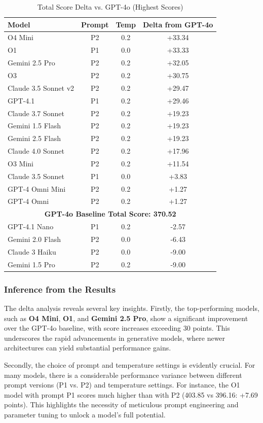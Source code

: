\begin{table}[!htbp]
\centering
\small
\caption{Total Score Delta vs. GPT-4o (Highest Scores)}
\label{tab:deepeval_delta_results}
\begin{tabular}{|l|c|c|c|}
\hline
\textbf{Model} & \textbf{Prompt} & \textbf{Temp} & \textbf{Delta from GPT-4o} \\
\hline
O4 Mini & P2 & 0.2 & +33.34 \\
O1 & P1 & 0.0 & +33.33 \\
Gemini 2.5 Pro & P2 & 0.2 & +32.05 \\
O3 & P2 & 0.2 & +30.75 \\
Claude 3.5 Sonnet v2 & P2 & 0.2 & +29.47 \\
GPT-4.1 & P1 & 0.2 & +29.46 \\
Claude 3.7 Sonnet & P2 & 0.2 & +19.23 \\
Gemini 1.5 Flash & P2 & 0.2 & +19.23 \\
Gemini 2.5 Flash & P2 & 0.2 & +19.23 \\
Claude 4.0 Sonnet & P2 & 0.2 & +17.96 \\
O3 Mini & P2 & 0.2 & +11.54 \\
Claude 3.5 Sonnet & P1 & 0.0 & +3.83 \\
GPT-4 Omni Mini & P2 & 0.2 & +1.27 \\
GPT-4 Omni & P2 & 0.2 & +1.27 \\
\hline
\multicolumn{4}{|c|}{\textbf{GPT-4o Baseline Total Score: 370.52}} \\
\hline
GPT-4.1 Nano & P1 & 0.2 & -2.57 \\
Gemini 2.0 Flash & P2 & 0.0 & -6.43 \\
Claude 3 Haiku & P2 & 0.0 & -9.00 \\
Gemini 1.5 Pro & P2 & 0.2 & -9.00 \\
\hline
\end{tabular}
\end{table}

\subsubsection{Inference from the Results}
The delta analysis reveals several key insights. Firstly, the top-performing models, such as \textbf{O4 Mini}, \textbf{O1}, and \textbf{Gemini 2.5 Pro}, show a significant improvement over the GPT-4o baseline, with score increases exceeding 30 points. This underscores the rapid advancements in generative models, where newer architectures can yield substantial performance gains.

Secondly, the choice of prompt and temperature settings is evidently crucial. For many models, there is a considerable performance variance between different prompt versions (P1 vs. P2) and temperature settings. For instance, the O1 model with prompt P1 scores much higher than with P2 (403.85 vs 396.16: +7.69 points). This highlights the necessity of meticulous prompt engineering and parameter tuning to unlock a model's full potential.
